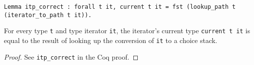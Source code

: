\documentclass[a4paper,UKenglish]{lipics-v2018}
\begin{document}
\begin{lemma}
\begin{verbatim}
Lemma itp_correct : forall t it, current t it = fst (lookup_path t (iterator_to_path t it)).
\end{verbatim}

For every type \verb|t| and type iterator \verb|it|, the iterator's current type \verb|current t it| is equal
to the result of looking up the conversion of \verb|it| to a choice stack.
\end{lemma}
\begin{proof}
See \verb|itp_correct| in the Coq proof.
\end{proof}
\end{document}
